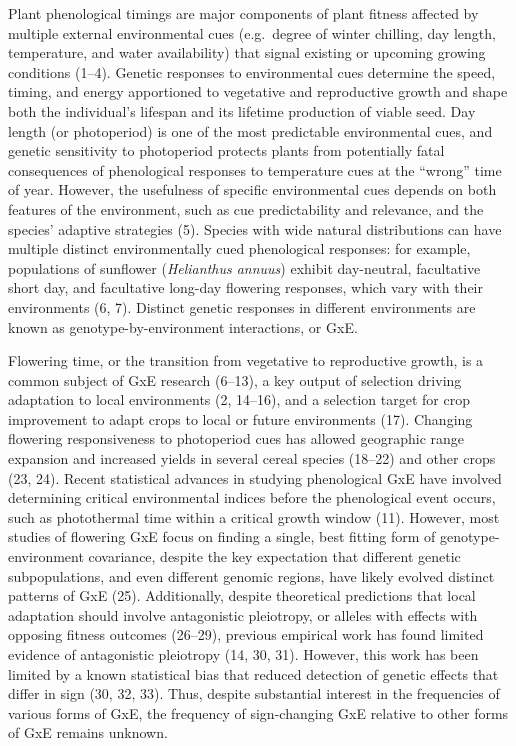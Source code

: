 \documentclass[
  9pt,
  twocolumn,
  twoside]{pnas-new}
\begin{document}
Plant phenological timings are major components of plant fitness
affected by multiple external environmental cues (e.g.~degree of winter
chilling, day length, temperature, and water availability) that signal
existing or upcoming growing conditions (1--4). Genetic responses to
environmental cues determine the speed, timing, and energy apportioned
to vegetative and reproductive growth and shape both the individual's
lifespan and its lifetime production of viable seed. Day length (or
photoperiod) is one of the most predictable environmental cues, and
genetic sensitivity to photoperiod protects plants from potentially
fatal consequences of phenological responses to temperature cues at the
``wrong'' time of year. However, the usefulness of specific
environmental cues depends on both features of the environment, such as
cue predictability and relevance, and the species' adaptive strategies
(5). Species with wide natural distributions can have multiple distinct
environmentally cued phenological responses: for example, populations of
sunflower (\emph{Helianthus annuus}) exhibit day-neutral, facultative
short day, and facultative long-day flowering responses, which vary with
their environments (6, 7). Distinct genetic responses in different
environments are known as genotype-by-environment interactions, or GxE.

Flowering time, or the transition from vegetative to reproductive
growth, is a common subject of GxE research (6--13), a key output of
selection driving adaptation to local environments (2, 14--16), and a
selection target for crop improvement to adapt crops to local or future
environments (17). Changing flowering responsiveness to photoperiod cues
has allowed geographic range expansion and increased yields in several
cereal species (18--22) and other crops (23, 24). Recent statistical
advances in studying phenological GxE have involved determining critical
environmental indices before the phenological event occurs, such as
photothermal time within a critical growth window (11). However, most
studies of flowering GxE focus on finding a single, best fitting form of
genotype-environment covariance, despite the key expectation that
different genetic subpopulations, and even different genomic regions,
have likely evolved distinct patterns of GxE (25). Additionally, despite
theoretical predictions that local adaptation should involve
antagonistic pleiotropy, or alleles with effects with opposing fitness
outcomes (26--29), previous empirical work has found limited evidence of
antagonistic pleiotropy (14, 30, 31). However, this work has been
limited by a known statistical bias that reduced detection of genetic
effects that differ in sign (30, 32, 33). Thus, despite substantial
interest in the frequencies of various forms of GxE, the frequency of
sign-changing GxE relative to other forms of GxE remains unknown.
\end{document}
